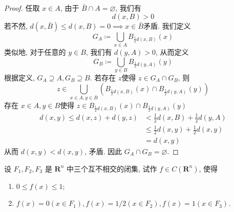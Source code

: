 \documentclass[../main.tex]{subfiles}
\begin{document}
\begin{proof}
   任取 \(  x \in A  \),  由于 \(  \bar{B}\cap A= \varnothing  \), 我们有 \[
   d\left( x, B \right)> 0 
   \]  若不然, \(  d\left( x, \bar{B} \right)\le d\left( x,B \right)= 0    \implies x \in \bar{B}\)矛盾. 我们定义 \[
   G_{A}\coloneqq \bigcup _{x \in A} B_{\frac{1 }{2 } d\left( x,B \right) }\left( x \right) 
   \]   类似地, 对于任意的 \(  y \in B  \), 我们有 \(  d\left( y,A \right)> 0   \), 从而定义 \[
   G_{B}\coloneqq \bigcup _{ y \in B} B_{\frac{1 }{2 }d\left( y,A \right)  }\left( y \right) 
   \]  根据定义,  \(  G_{A}\supseteq A, G_{B}\supseteq B  \). 若存在 \(  z  \)使得 \(  z \in G_{A}\cap G_{B}  \), 则  \[
   z \in \bigcup _{x\in A,y\in B} \left( B_{\frac{1 }{2 }d\left( x,B \right)  }\left( x \right)\cap B_{\frac{1 }{2 }d\left( y,A \right)  }\left( y \right)   \right) 
   \]存在 \(  x \in A, y \in B  \)使得  \(  z \in B_{\frac{1 }{2 }d\left( x,B \right)  }\left( x \right)\cap  B_{\frac{1 }{2 }d\left( y,A \right)  }\left( y \right)    \)   \[
  \begin{aligned}
   d\left( x,y \right)\le d\left( x,z \right)+ d\left( y,z \right)&<  \frac{1 }{2 }d\left( x,B \right)+ \frac{1 }{2 }d\left( y,A \right)      \\ 
    &\le \frac{1 }{2 }d\left( x,y \right)+ \frac{1 }{2 }d\left( x,y \right)\\ 
     &= d\left( x,y \right)     
  \end{aligned}  
   \]从而 \(  d\left( x,y \right)< d\left( x,y \right)    \), 矛盾. 因此 \(  G_{A}\cap G_{B}= \varnothing  \).  
\end{proof}
\begin{exercise}{}{}
设 $F_1, F_2, F_3$ 是 $\mathbf{R}^n$ 中三个互不相交的闭集, 试作 $f \in C(\mathbf{R}^n)$, 使得
\begin{enumerate}
\item[(i)] $0 \le f(x) \le 1$;
\item[(ii)] $f(x)=0(x \in F_1), f(x)=1/2(x \in F_2), f(x)=1(x \in F_3)$.
\end{enumerate}
\end{exercise}
\end{document}
